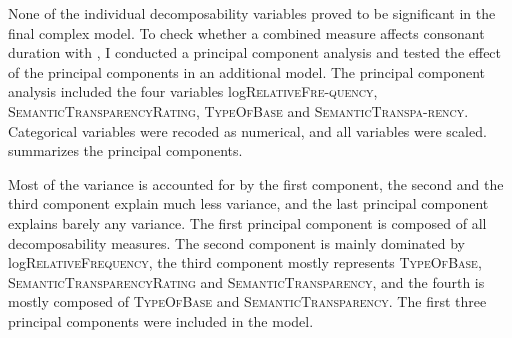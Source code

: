 None of the individual decomposability variables proved to be significant in the final complex model. To check whether a combined  measure affects consonant duration with , I conducted a principal component analysis and tested the effect of the principal components in an additional model. The principal component analysis included the four variables log\textsc{RelativeFre-quency}, \textsc{SemanticTransparencyRating}, \textsc{TypeOfBase} and \textsc{SemanticTranspa-rency}. Categorical variables were recoded as numerical, and all variables were scaled.  summarizes the principal components.



\begin{table}
	\caption{ Summary of principal components}
	\label{tbl: summary PC dis exp}
	
	
\end{table}


Most of the variance is accounted for by the first component, the second and the third component explain much less variance, and the last principal component explains barely any variance. 
The first principal component is composed of all decomposability measures. The second component is mainly dominated by log\textsc{RelativeFrequency}, the third component mostly represents \textsc{TypeOfBase}, \textsc{SemanticTransparencyRating} and \textsc{SemanticTransparency}, and the fourth is mostly composed of \textsc{TypeOfBase} and \textsc{SemanticTransparency}. The first three principal components were included in the model.


